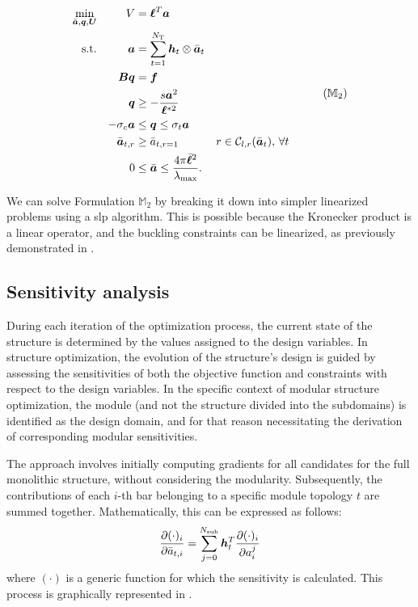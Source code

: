 \begin{equation}
    \begin{aligned}
    \min_{\bar{\vect{a}}, \vect{q}, \vect{U}}   && V &= \vect{\ell}^{T}\vect{a}\\
    \textrm{s.t.}  && \vect{a} &= \sum_{t=1}^{N_\text{T}} \vect{h}_t\otimes\bar{\vect{a}}_t \\ 
    && \matr{B}\vect{q} &= \vect{f} && \\
    && \vect{q} &\geq -\frac{s\vect{a}^2}{\vect{\ell}^{*2}} &&  \\
    && -\sigma_c\vect{a} &\leq \vect{q} \leq \sigma_t\vect{a} &&  \\
    && \bar{\vect{a}}_{t,r}&\geq \bar{a}_{t,r=1} && r \in \mathcal{C}_{l,r}(\bar{\vect{a}}_t),\, \forall t \\
    && 0 &\leq \bar{\vect{a}} \leq \frac{4 \pi \bar{\vect{\ell}}^2}{\lambda_{\text{max}}}. \\
    \end{aligned}
    \tag{${\mathbb{M}}_\text{2}$}
    \label{eq:05_optim_no_constr_modular}
\end{equation}

We can solve Formulation $\mathbb{M}_2$ by breaking it down into simpler linearized problems using a \gls{slp} algorithm. This is possible because the Kronecker product is a linear operator, and the buckling constraints can be linearized, as previously demonstrated in .

\subsection{Sensitivity analysis}
During each iteration of the optimization process, the current state of the structure is determined by the values assigned to the design variables. In structure optimization, the evolution of the structure's design is guided by assessing the sensitivities of both the objective function and constraints with respect to the design variables. In the specific context of modular structure optimization, the module (and not the structure divided into the subdomains) is identified as the design domain, and for that reason necessitating the derivation of corresponding modular sensitivities.

The approach involves initially computing gradients for all candidates for the full monolithic structure, without considering the modularity. Subsequently, the contributions of each $i$-th bar belonging to a specific module topology $t$ are summed together. Mathematically, this can be expressed as follows:
\begin{equation}
    \frac{\partial(\cdot)_i}{\partial\bar{a}_{t,i}} =  \sum_{j=0}^{N_\text{sub}} \bm{h}_t^T \frac{\partial(\cdot)_i}{\partial a^j_i} 
    \label{eq:05_VL_grad}
\end{equation}
where $(\cdot)$ is a generic function for which the sensitivity is calculated. This process is graphically represented in .

